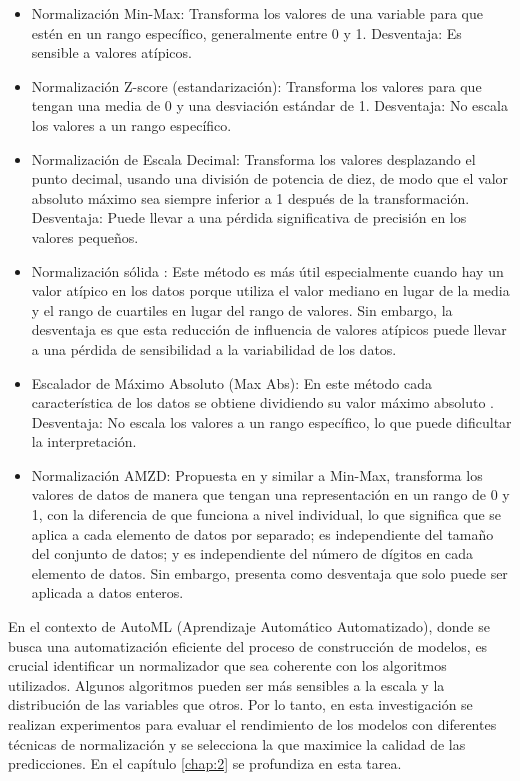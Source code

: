 \begin{itemize}
	\item Normalización Min-Max: Transforma los valores de una variable para que estén en un rango específico, generalmente entre 0 y 1. Desventaja: Es sensible a valores atípicos.
	\item Normalización Z-score (estandarización): Transforma los valores para que tengan una media de 0 y una desviación estándar de 1. Desventaja: No escala los valores a un rango específico.
	\item Normalización de Escala Decimal: Transforma los valores desplazando el punto decimal, usando una división de potencia de diez, de modo que el valor absoluto máximo sea siempre inferior a 1 después de la transformación. Desventaja: Puede llevar a una pérdida significativa de precisión en los valores pequeños. 
	\item Normalización sólida \citep{polatgil2022investigation}: Este método es más útil especialmente cuando hay un valor atípico en los datos porque utiliza el valor mediano en lugar de la media y el rango de cuartiles en lugar del rango de valores. Sin embargo, la desventaja es que esta reducción de influencia de valores atípicos puede llevar a una pérdida de sensibilidad a la variabilidad de los datos.
	\item Escalador de Máximo Absoluto (Max Abs): En este método cada característica de los datos se obtiene dividiendo su valor máximo absoluto \citep{polatgil2022investigation}. Desventaja: No escala los valores a un rango específico, lo que puede dificultar la interpretación.
	\item Normalización AMZD: Propuesta en \citep{patro2015normalization} y similar a Min-Max, transforma los valores de datos de manera que tengan una representación en un rango de 0 y 1, con la diferencia de que funciona a nivel individual, lo que significa que se aplica a cada elemento de datos por separado; es independiente del tamaño del conjunto de datos; y
	es independiente del número de dígitos en cada elemento de datos. Sin embargo,  presenta como desventaja que solo puede ser aplicada a datos enteros.
\end{itemize}

En el contexto de AutoML (Aprendizaje Automático Automatizado), donde se busca una automatización eficiente del proceso de construcción de modelos, es crucial identificar un normalizador que sea coherente con los algoritmos utilizados. Algunos algoritmos pueden ser más sensibles a la escala y la distribución de las variables que otros. Por lo tanto, en esta investigación se realizan experimentos para evaluar el rendimiento de los modelos con diferentes técnicas de normalización y se selecciona la que maximice la calidad de las predicciones. En el capítulo \ref{chap:2} se profundiza en esta tarea.

